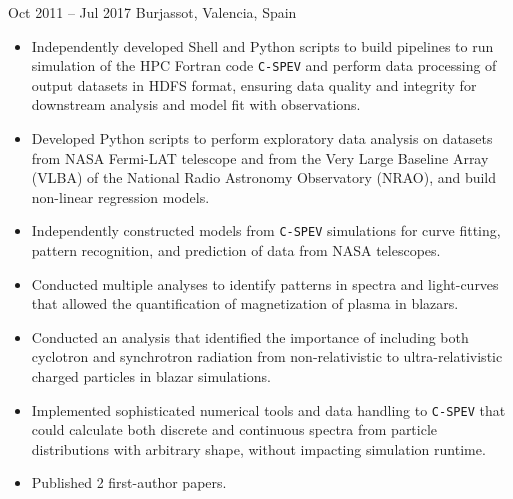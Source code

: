 {Oct 2011 -- Jul 2017}%
{Burjassot, Valencia, Spain}%
{%
\begin{itemize}
    \item Independently developed Shell and Python scripts to build pipelines to run simulation of the HPC Fortran code \texttt{C-SPEV} and perform data processing of output datasets in HDFS format, ensuring data quality and integrity for downstream analysis and model fit with observations.
    \item Developed Python scripts to perform exploratory data analysis on datasets from NASA Fermi-LAT telescope and from the Very Large Baseline Array (VLBA) of the National Radio Astronomy Observatory (NRAO), and build non-linear regression models.
    \item Independently constructed models from \texttt{C-SPEV} simulations for curve fitting, pattern recognition, and prediction of data from NASA telescopes.
    \item Conducted multiple analyses to identify patterns in spectra and light-curves that allowed the quantification of magnetization of plasma in blazars.
    \item Conducted an analysis that identified the importance of including both cyclotron and synchrotron radiation from non-relativistic to ultra-relativistic charged particles in blazar simulations.
    \item Implemented sophisticated numerical tools and data handling to \texttt{C-SPEV} that could calculate both discrete and continuous spectra from particle distributions with arbitrary shape, without impacting simulation runtime.
    \item Published 2 first-author papers.
\end{itemize}
}
